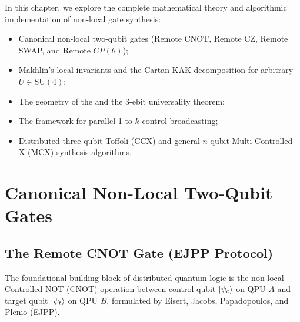 In this chapter, we explore the complete mathematical theory and algorithmic implementation of non-local gate synthesis:
\begin{itemize}
    \item Canonical non-local two-qubit gates (Remote CNOT, Remote CZ, Remote SWAP, and Remote $CP(\theta)$);
    \item Makhlin's local invariants and the Cartan KAK decomposition for arbitrary $U \in \text{SU}(4)$;
    \item The geometry of the  and the 3-ebit universality theorem;
    \item The  framework for parallel 1-to-$k$ control broadcasting;
    \item Distributed three-qubit Toffoli (CCX) and general $n$-qubit Multi-Controlled-X (MCX) synthesis algorithms.
\end{itemize}

\section{Canonical Non-Local Two-Qubit Gates}
\label{sec:canonical_2q_synthesis}

\subsection{The Remote CNOT Gate (EJPP Protocol)}
The foundational building block of distributed quantum logic is the non-local Controlled-NOT (CNOT) operation between control qubit $\ket{\psi_c}$ on QPU $A$ and target qubit $\ket{\psi_t}$ on QPU $B$, formulated by Eisert, Jacobs, Papadopoulos, and Plenio (EJPP).


